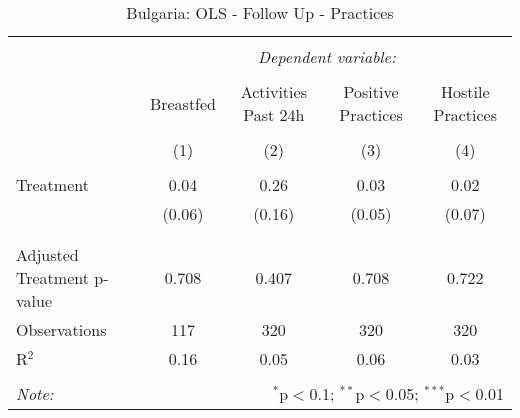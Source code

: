 
\begin{table}[!htbp] \centering 
  \caption{Bulgaria: OLS - Follow Up - Practices} 
  \label{tbl:Bulgaria: OLS - Follow Up - Practices} 
\begin{tabular}{@{\extracolsep{5pt}}lcccc} 
\\[-1.8ex]\hline 
\hline \\[-1.8ex] 
 & \multicolumn{4}{c}{\textit{Dependent variable:}} \\ 
\cline{2-5} 
\\[-1.8ex] & Breastfed & Activities Past 24h & Positive Practices & Hostile Practices \\ 
\\[-1.8ex] & (1) & (2) & (3) & (4)\\ 
\hline \\[-1.8ex] 
 Treatment & 0.04 & 0.26 & 0.03 & 0.02 \\ 
  & (0.06) & (0.16) & (0.05) & (0.07) \\ 
  & & & & \\ 
\hline \\[-1.8ex] 
Adjusted Treatment p-value & 0.708 & 0.407 & 0.708 & 0.722 \\ 
Observations & 117 & 320 & 320 & 320 \\ 
R$^{2}$ & 0.16 & 0.05 & 0.06 & 0.03 \\ 
\hline 
\hline \\[-1.8ex] 
\textit{Note:}  & \multicolumn{4}{r}{$^{*}$p$<$0.1; $^{**}$p$<$0.05; $^{***}$p$<$0.01} \\ 
\end{tabular} 
\end{table} 
